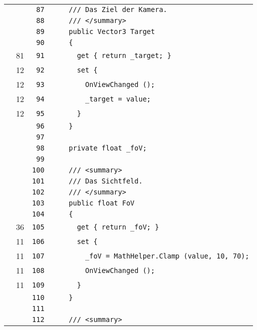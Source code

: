 \documentclass[a4paper,10pt]{article}
\begin{document}
\begin{longtable}[l]{lrrl}
\cellcolor{gray} &  & \verb~87~ & \verb~    /// Das Ziel der Kamera.~\\
\cellcolor{gray} &  & \verb~88~ & \verb~    /// </summary>~\\
\cellcolor{gray} &  & \verb~89~ & \verb~    public Vector3 Target~\\
\cellcolor{gray} &  & \verb~90~ & \verb~    {~\\
\cellcolor{green} & 81 & \verb~91~ & \verb~      get { return _target; }~\\
\cellcolor{green} & 12 & \verb~92~ & \verb~      set {~\\
\cellcolor{green} & 12 & \verb~93~ & \verb~        OnViewChanged ();~\\
\cellcolor{green} & 12 & \verb~94~ & \verb~        _target = value;~\\
\cellcolor{green} & 12 & \verb~95~ & \verb~      }~\\
\cellcolor{gray} &  & \verb~96~ & \verb~    }~\\
\cellcolor{gray} &  & \verb~97~ & \verb~~\\
\cellcolor{gray} &  & \verb~98~ & \verb~    private float _foV;~\\
\cellcolor{gray} &  & \verb~99~ & \verb~~\\
\cellcolor{gray} &  & \verb~100~ & \verb~    /// <summary>~\\
\cellcolor{gray} &  & \verb~101~ & \verb~    /// Das Sichtfeld.~\\
\cellcolor{gray} &  & \verb~102~ & \verb~    /// </summary>~\\
\cellcolor{gray} &  & \verb~103~ & \verb~    public float FoV~\\
\cellcolor{gray} &  & \verb~104~ & \verb~    {~\\
\cellcolor{green} & 36 & \verb~105~ & \verb~      get { return _foV; }~\\
\cellcolor{green} & 11 & \verb~106~ & \verb~      set {~\\
\cellcolor{green} & 11 & \verb~107~ & \verb~        _foV = MathHelper.Clamp (value, 10, 70);~\\
\cellcolor{green} & 11 & \verb~108~ & \verb~        OnViewChanged ();~\\
\cellcolor{green} & 11 & \verb~109~ & \verb~      }~\\
\cellcolor{gray} &  & \verb~110~ & \verb~    }~\\
\cellcolor{gray} &  & \verb~111~ & \verb~~\\
\cellcolor{gray} &  & \verb~112~ & \verb~    /// <summary>~\\

\end{longtable}
\end{document}
